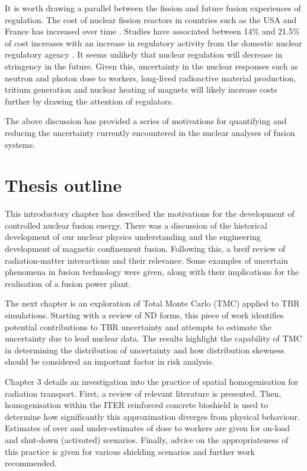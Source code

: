 It is worth drawing a parallel between the fission and future fusion experiences of regulation. The cost of nuclear fission reactors in countries such as the USA and France has increased over time \cite{Lovering2016}. Studies have associated between 14\% and 21.5\% of cost increases with an increase in regulatory activity from the domestic nuclear regulatory agency \cite{Cantor1988}. It seems unlikely that nuclear regulation will decrease in stringency in the future. Given this, uncertainty in the nuclear responses such as neutron and photon dose to workers, long-lived radioactive material production, tritium generation and nuclear heating of magnets will likely increase costs further by drawing the attention of regulators.

The above discussion has provided a series of motivations for quantifying and reducing the uncertainty currently encountered in the nuclear analyses of fusion systems.


\section{Thesis outline}
This introductory chapter has described the motivations for the development of controlled nuclear fusion energy. There was a discussion of the historical development of our nuclear physics understanding and the engineering development of magnetic confinement fusion. Following this, a breif review of radiation-matter interactions and their relevance. Some examples of uncertain phenomena in fusion technology were given, along with their implications for the realisation of a fusion power plant. 

The next chapter is an exploration of Total Monte Carlo (TMC)  applied to TBR simulations. Starting with a review of ND forms, this piece of work identifies potential contributions to TBR uncertainty and attempts to estimate the uncertainty due to lead nuclear data. The results highlight the capability of TMC in determining the distribution of uncertainty and how distribution skewness should be considered an important factor in risk analysis.

Chapter 3 details an investigation into the practice of spatial homogenisation for radiation transport. First, a review of relevant literature is presented. Then, homogenisation within the ITER reinforced concrete bioshield is used to determine how significantly this approximation diverges from physical behaviour. Estimates of over and under-estimates of dose to workers are given for on-load and shut-down (activated) scenarios. Finally, advice on the appropriateness of this practice is given for various shielding scenarios and further work recommended.

